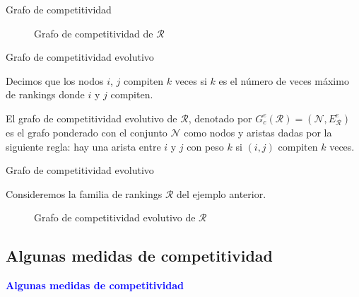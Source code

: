 \documentclass[10pt,hyperref={unicode}]{beamer}
\begin{document}
	\begin{frame}{Grafo de competitividad}
		\begin{ejemplo}[continuación]
			\begin{figure}
				\centering
				\ejemplografocompetitividad
				\caption{Grafo de competitividad de $\mathcal{R}$}
				\label{fig:grafo_competitividad}
			\end{figure}	
		\end{ejemplo}
	\end{frame}
	
	\begin{frame}{Grafo de competitividad evolutivo}
		\begin{defi}
			Decimos que los nodos $i$, $j$ compiten $k$ veces si $k$ es el número de veces máximo de rankings donde $i$ y $j$ compiten.
		\end{defi}
		
		\begin{defi}
			El grafo de competitividad evolutivo de $\mathcal{R}$, denotado por $G_c^e(\mathcal{R}) = (\mathcal{N}, E_\mathcal{R}^e)$ es el grafo ponderado con el conjunto $\mathcal{N}$ como nodos y aristas dadas por la siguiente regla: hay una arista entre $i$ y $j$ con peso $k$ si $(i,j)$ compiten $k$ veces.
		\end{defi}
	\end{frame}
	
	\begin{frame}{Grafo de competitividad evolutivo}
		\begin{ejemplo}
			Consideremos la familia de rankings $\mathcal{R}$ del ejemplo anterior.
			
			\begin{figure}
				\centering
				\resizebox{!}{0.5\textheight}{\ejemplografocompetitividadevolutivo}
				
				\caption{Grafo de competitividad evolutivo de $\mathcal{R}$}
				\label{fig:grafo_competitividad_evolutivo}
			\end{figure}
			
		\end{ejemplo}
	\end{frame}
	
	\subsection*{Algunas medidas de competitividad}
	
	\begin{frame}
		\begin{center}
			\Huge\textbf{\textsf{\textcolor{blue}{Algunas medidas de competitividad}}}
		\end{center}
	\end{frame}
	
\end{document}
